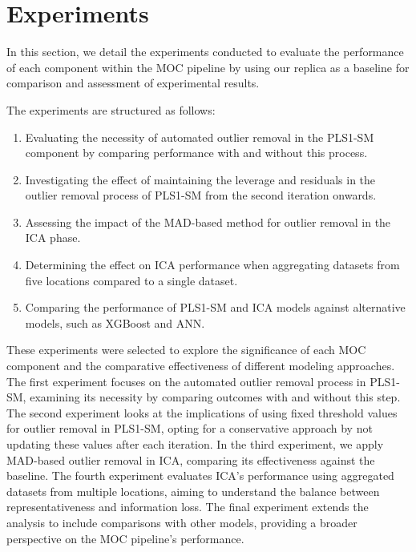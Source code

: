 \section{Experiments}\label{sec:experiments}
In this section, we detail the experiments conducted to evaluate the performance of each component within the MOC pipeline by using our replica as a baseline for comparison and assessment of experimental results.

The experiments are structured as follows:

\begin{enumerate}
    \item Evaluating the necessity of automated outlier removal in the PLS1-SM component by comparing performance with and without this process.
    \item Investigating the effect of maintaining the leverage and residuals in the outlier removal process of PLS1-SM from the second iteration onwards.
    \item Assessing the impact of the MAD-based method for outlier removal in the ICA phase.
    \item Determining the effect on ICA performance when aggregating datasets from five locations compared to a single dataset.
    \item Comparing the performance of PLS1-SM and ICA models against alternative models, such as XGBoost and ANN.
\end{enumerate}

These experiments were selected to explore the significance of each MOC component and the comparative effectiveness of different modeling approaches.
The first experiment focuses on the automated outlier removal process in PLS1-SM, examining its necessity by comparing outcomes with and without this step.
The second experiment looks at the implications of using fixed threshold values for outlier removal in PLS1-SM, opting for a conservative approach by not updating these values after each iteration.
In the third experiment, we apply MAD-based outlier removal in ICA, comparing its effectiveness against the baseline.
The fourth experiment evaluates ICA's performance using aggregated datasets from multiple locations, aiming to understand the balance between representativeness and information loss.
The final experiment extends the analysis to include comparisons with other models, providing a broader perspective on the MOC pipeline's performance.

